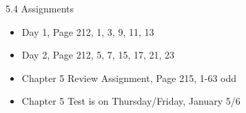 \documentclass[ignorenonframetext,]{beamer}
\providecommand{\tightlist}{%
  \setlength{\itemsep}{0pt}\setlength{\parskip}{0pt}}
\begin{document}
\begin{frame}{5.4 Assignments}

\begin{itemize}
\tightlist
\item
  Day 1, Page 212, 1, 3, 9, 11, 13
\item
  Day 2, Page 212, 5, 7, 15, 17, 21, 23
\item
  Chapter 5 Review Assignment, Page 215, 1-63 odd
\item
  Chapter 5 Test is on Thursday/Friday, January 5/6
\end{itemize}

\end{frame}
\end{document}
